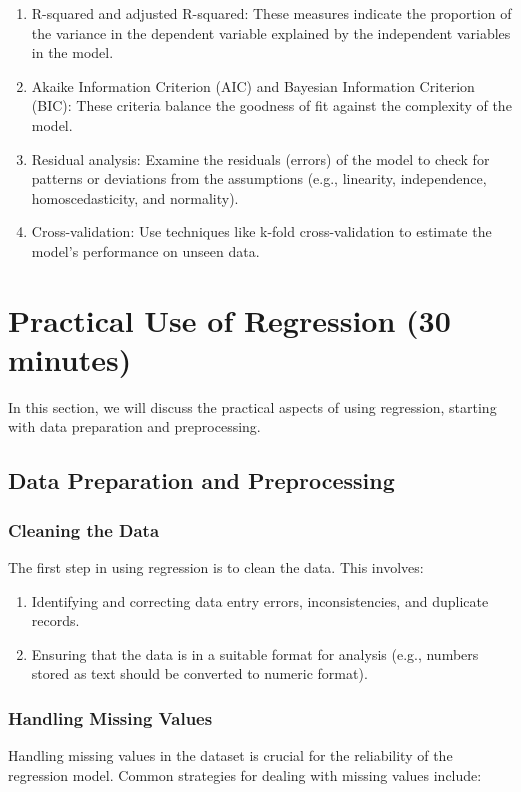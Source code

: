 \documentclass{beamer}
\begin{document}
\begin{enumerate}
\item R-squared and adjusted R-squared: These measures indicate the proportion of the variance in the dependent variable explained by the independent variables in the model.
\item Akaike Information Criterion (AIC) and Bayesian Information Criterion (BIC): These criteria balance the goodness of fit against the complexity of the model.
\item Residual analysis: Examine the residuals (errors) of the model to check for patterns or deviations from the assumptions (e.g., linearity, independence, homoscedasticity, and normality).
\item Cross-validation: Use techniques like k-fold cross-validation to estimate the model's performance on unseen data.
\end{enumerate}

\section{Practical Use of Regression (30 minutes)}

In this section, we will discuss the practical aspects of using regression, starting with data preparation and preprocessing.

\subsection{Data Preparation and Preprocessing}

\subsubsection{Cleaning the Data}
The first step in using regression is to clean the data. This involves:

\begin{enumerate}
\item Identifying and correcting data entry errors, inconsistencies, and duplicate records.
\item Ensuring that the data is in a suitable format for analysis (e.g., numbers stored as text should be converted to numeric format).
\end{enumerate}

\subsubsection{Handling Missing Values}
Handling missing values in the dataset is crucial for the reliability of the regression model. Common strategies for dealing with missing values include:
\end{document}
